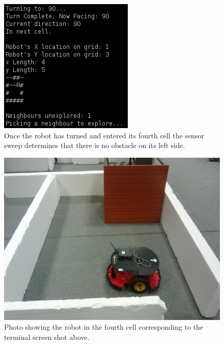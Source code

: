 \documentclass[a4paper,12pt]{article}
\begin{document}
\begin{figure}[H]
\includegraphics[scale=1.0]{RealRunT4.png}
\caption{Once the robot has turned and entered its fourth cell the sensor sweep determines that there is no obstacle on its left side.}
\end{figure}

\begin{figure}[H]
\includegraphics[scale=0.13]{RealS4.jpg}
\caption{Photo showing the robot in the fourth cell corresponding to the terminal screen shot above.}
\end{figure}
\end{document}
